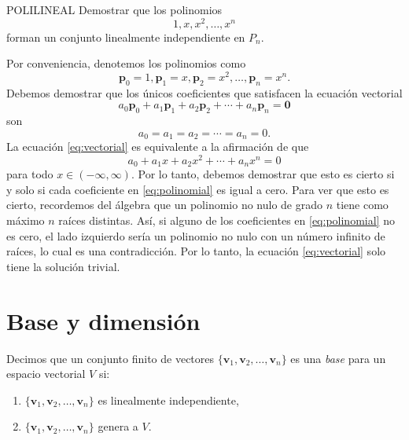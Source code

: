 \newpage

\begin{examplebox}{}{POLILINEAL}
    Demostrar que los polinomios
    $$1, x, x^2, \dots, x^n$$
    forman un conjunto linealmente independiente en $P_n$.

    \tcblower
    \solucion Por conveniencia, denotemos los polinomios como
    $$\mathbf{p}_0 = 1, \mathbf{p}_1 = x, \mathbf{p}_2 = x^2, \dots, \mathbf{p}_n = x^n.$$
    Debemos demostrar que los únicos coeficientes que satisfacen la ecuación vectorial
    \begin{equation}
        a_0\mathbf{p}_0 + a_1\mathbf{p}_1 + a_2\mathbf{p}_2 + \cdots + a_n\mathbf{p}_n = \mathbf{0} \label{eq:vectorial}
    \end{equation}
    son
    $$a_0 = a_1 = a_2 = \cdots = a_n = 0.$$
    La ecuación \eqref{eq:vectorial} es equivalente a la afirmación de que
    \begin{equation}
        a_0 + a_1x + a_2x^2 + \cdots + a_nx^n = 0 \label{eq:polinomial}
    \end{equation}
    para todo $x \in (-\infty, \infty)$. Por lo tanto, debemos demostrar que esto es cierto si y solo si cada coeficiente en \eqref{eq:polinomial} es igual a cero. Para ver que esto es cierto, recordemos del álgebra que un polinomio no nulo de grado $n$ tiene como máximo $n$ raíces distintas. Así, si alguno de los coeficientes en \eqref{eq:polinomial} no es cero, el lado izquierdo sería un polinomio no nulo con un número infinito de raíces, lo cual es una contradicción. Por lo tanto, la ecuación \eqref{eq:vectorial} solo tiene la solución trivial.
\end{examplebox}

\section{Base y dimensión}

\begin{definicion}{}{}
    Decimos que un conjunto finito de vectores $\{ \mathbf{v}_1, \mathbf{v}_2, \dots, \mathbf{v}_n \}$ es una \emph{base} para un espacio vectorial $V$ si:
    \begin{enumerate}[label=\roman*), topsep=6pt, itemsep=0pt]
        \item $\{ \mathbf{v}_1, \mathbf{v}_2, \dots, \mathbf{v}_n \}$ es linealmente independiente,
        \item $\{ \mathbf{v}_1, \mathbf{v}_2, \dots, \mathbf{v}_n \}$ genera a $V$.
    \end{enumerate}
\end{definicion}

